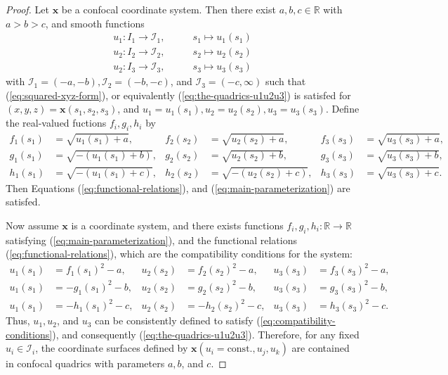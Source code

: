 \documentclass[10pt, a4paper]{article}
\theoremstyle{BoldTopSpacing}
\theoremstyle{BoldTopSpacing}
\theoremstyle{BoldTopSpacing}
\theoremstyle{BoldTopBottomSpacing}
\theoremstyle{BoldTopSpacing}
\theoremstyle{BoldTopBottomSpacing}
\theoremstyle{remark}
\begin{document}
\begin{proof}
Let $\boldsymbol{x}$ be a confocal coordinate system. Then there exist $a, b, c \in \mathbb{R}$ with $a > b > c$, and smooth functions
\begin{equation*}
\begin{aligned}
u_{1} : I_{1} \to \mathcal{I}_{1}, &\quad \quad s_{1} \mapsto u_{1}(s_{1}) \\
u_{2} : I_{2} \to \mathcal{I}_{2}, &\quad \quad s_{2} \mapsto u_{2}(s_{2}) \\
u_{2} : I_{3} \to \mathcal{I}_{3}, &\quad \quad s_{3} \mapsto u_{3}(s_{3})
\end{aligned}
\end{equation*}
with $\mathcal{I}_{1} = (-a, -b), \mathcal{I}_{2} = (-b, -c)$, and $\mathcal{I}_{3} = (-c, \infty)$ such that (\ref{eq:squared-xyz-form}), or equivalently (\ref{eq:the-quadrics-u1u2u3}) is satisfed for $(x, y, z) = \boldsymbol{x}(s_{1}, s_{2}, s_{3})$, and $u_{1} = u_{1}(s_{1}), u_{2} = u_{2}(s_{2}), u_{3} = u_{3}(s_{3})$. Define the real-valued fuctions $f_{i}, g_{i}, h_{i}$ by
\begin{equation*}
\begin{aligned}
f_{1}(s_{1}) &= \sqrt{u_{1}(s_{1}) + a}, & f_{2}(s_{2}) &= \sqrt{u_{2}(s_{2}) + a}, & f_{3}(s_{3}) &= \sqrt{u_{3}(s_{3}) + a}, \\
g_{1}(s_{1}) &= \sqrt{-(u_{1}(s_{1}) + b)}, & g_{2}(s_{2}) &= \sqrt{u_{2}(s_{2}) + b}, & g_{3}(s_{3}) &= \sqrt{u_{3}(s_{3}) + b}, \\
h_{1}(s_{1}) &= \sqrt{-(u_{1}(s_{1}) + c)}, & h_{2}(s_{2}) &= \sqrt{-(u_{2}(s_{2}) + c)}, & h_{3}(s_{3}) &= \sqrt{u_{3}(s_{3}) + c}.
\end{aligned}
\end{equation*}
Then Equations (\ref{eq:functional-relations}), and (\ref{eq:main-parameterization}) are satisfed. \par
Now assume $\boldsymbol{x}$ is a coordinate system, and there exists functions $f_{i}, g_{i}, h_{i} : \mathbb{R} \to \mathbb{R}$ satisfying (\ref{eq:main-parameterization}), and the functional relations (\ref{eq:functional-relations}), which are the compatibility conditions for the system:
\begin{equation}
\begin{aligned}
\label{eq:compatibility-conditions}
u_{1}(s_{1}) &= f_{1}(s_{1})^2 - a, & u_{2}(s_{2}) &= f_{2}(s_{2})^2 - a, & u_{3}(s_{3}) &= f_{3}(s_{3})^2 - a, \\
u_{1}(s_{1}) &= -g_{1}(s_{1})^2 - b, & u_{2}(s_{2}) &= g_{2}(s_{2})^2 - b, & u_{3}(s_{3}) &= g_{3}(s_{3})^2 - b, \\
u_{1}(s_{1}) &= -h_{1}(s_{1})^2 - c, & u_{2}(s_{2}) &= -h_{2}(s_{2})^2 - c, & u_{3}(s_{3}) &= h_{3}(s_{3})^2 - c.
\end{aligned}
\end{equation}
Thus, $u_{1}, u_{2}$, and $u_{3}$ can be consistently defined to satisfy (\ref{eq:compatibility-conditions}), and consequently (\ref{eq:the-quadrics-u1u2u3}). Therefore, for any fixed $u_{i} \in \mathcal{I}_{i}$, the coordinate surfaces defined by $\boldsymbol{x}(u_{i} = \text{const.}, u_{j}, u_{k})$ are contained in confocal quadrics with parameters $a, b$, and $c$.
\end{proof}
\end{document}
